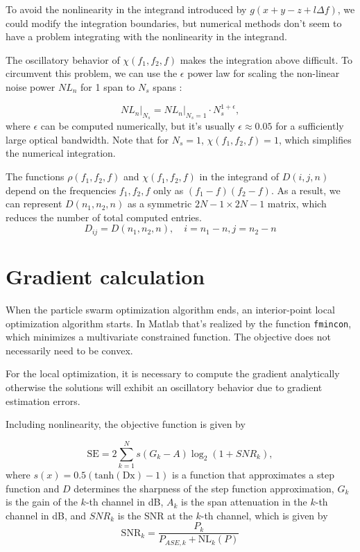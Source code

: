 \documentclass[a4paper]{article}
\begin{document}
To avoid the nonlinearity in the integrand introduced by $g(x+y-z+l\Delta f)$, we could modify the integration boundaries, but numerical methods don't seem to have a problem integrating with the nonlinearity in the integrand.

The oscillatory behavior of $\chi(f_1, f_2, f)$ makes the integration above difficult. To circumvent this problem, we can use the $\epsilon$ power law for scaling the non-linear noise power $NL_n$ for 1 span to $N_s$ spans \cite{Poggiolini2012}:

\begin{equation}
	NL_n\Big|_{N_s} = NL_n\Big|_{N_s = 1}\cdot N_s^{1+\epsilon},
\end{equation}
where $\epsilon$ can be computed numerically, but it's usually $\epsilon \approx 0.05$ for a sufficiently large optical bandwidth. Note that for $N_s = 1$, $\chi(f_1, f_2, f) = 1$, which simplifies the numerical integration.
 
The functions $\rho(f_1, f_2, f)$ and $\chi(f_1, f_2, f)$ in the integrand of $D(i, j, n)$ depend on the frequencies $f_1, f_2, f$ only as $(f_1-f)(f_2-f)$. As a result, we can represent $D(n_1, n_2, n)$ as a symmetric $2N-1\times 2N-1$ matrix, which reduces the number of total computed entries.
\begin{equation}
	D_{ij} = D(n_1, n_2, n), \quad i = n_1 - n, j = n_2 - n
\end{equation}

\section{Gradient calculation}

When the particle swarm optimization algorithm ends, an interior-point local optimization algorithm starts. In Matlab that's realized by the function \texttt{fmincon}, which minimizes a multivariate constrained function. The objective does not necessarily need to be convex.

For the local optimization, it is necessary to compute the gradient analytically otherwise the solutions will exhibit an oscillatory behavior due to gradient estimation errors.

Including nonlinearity, the objective function is given by

\begin{equation} \label{eq:grad:SE}
	\mathrm{SE} = 2\sum_{k = 1}^N s(G_k - A)\log_2(1 +  SNR_k),
\end{equation}
where $s(x) = 0.5(\mathrm{tanh(Dx)}-1)$ is a function that approximates a step function and $D$ determines the sharpness of the step function approximation, $G_k$ is the gain of the $k$-th channel in dB, $A_k$ is the span attenuation in the $k$-th channel in dB, and $SNR_k$ is the SNR at the $k$-th channel, which is given by
\begin{equation}
	\mathrm{SNR}_k = \frac{P_k}{P_{ASE, k} + \mathrm{NL}_k(P)}
\end{equation}
\end{document}
